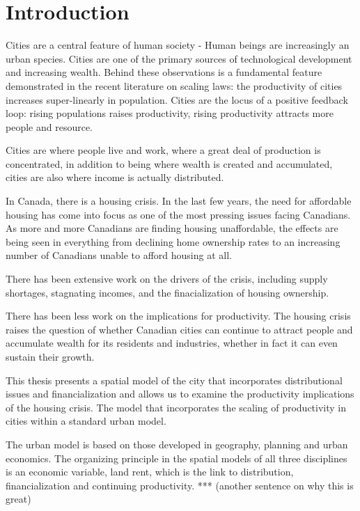 \chapter{Introduction}

Cities are a central feature of human society - Human beings are increasingly an urban species. Cities are one of the primary sources of technological development and increasing wealth. Behind these observations is a fundamental feature demonstrated in the recent literature on scaling laws: the productivity of cities increases super-linearly in population. Cities are the locus of a positive feedback loop: rising populations raises productivity, rising productivity attracts more people and resource.

Cities are where people live and work, where a great deal of production is concentrated, in addition to being where wealth is created and accumulated, cities are also where income is actually distributed. 

In Canada, there is a housing crisis. In the last few years, the need for affordable housing has come into focus as one of the most pressing issues facing Canadians. As more and more Canadians are finding housing unaffordable, the effects are being seen in everything from declining home ownership rates to an increasing number of Canadians unable to afford housing at all.

There has been extensive work on the drivers of the crisis, including supply shortages, stagnating incomes, and the finacialization of housing ownership.

There has been less work on the implications for productivity. The housing crisis raises the question of whether Canadian cities can continue to attract people and accumulate wealth for its residents and industries, whether in fact it can even sustain their growth.

This thesis presents a spatial model of the city that incorporates distributional issues and financialization and allows us to examine the productivity implications of the housing crisis. The model that incorporates the scaling of productivity in cities within a standard urban model. 

The urban model is based on those developed in geography, planning and urban economics. The organizing principle in  the spatial models of all three disciplines is an economic variable, land rent, which is the link to distribution, financialization and continuing productivity. *** (another sentence on why this is great)

